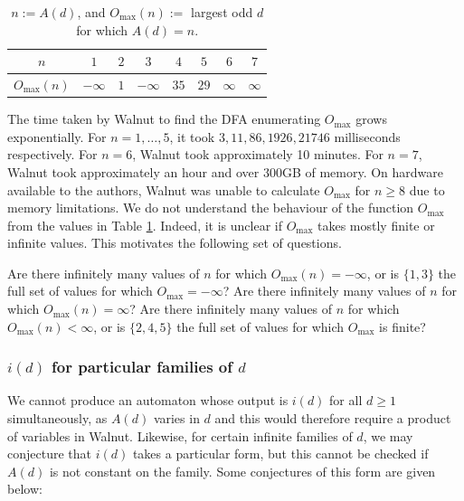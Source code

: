\documentclass[10pt,a4paper,reqno]{amsart}
\newcommand{\walnut}{{\ttfamily Walnut}}
\begin{document}
\begin{table}[ht]
    \centering
    \begin{tabular}{|c|c|c|c|c|c|c|c|}
    \hline
       $n$  & $1$ & $2$& $3$& $4$& $5$& $6$& $7$ \\
       \hline
       $O_{\max}(n)$ & $-\infty$& $1$& $-\infty$& $35$ & $29$& $\infty$& $\infty$\\
        \hline
    \end{tabular}
    \caption{$n:=A(d)$, and $O_{\max}(n):=$ largest odd $d$ for which $A(d)=n$.}
    \label{tab:tmlodforad}
\end{table}
    The time taken by \walnut{} to find the DFA enumerating $O_{\max}$ grows exponentially. For $n=1,\dots ,5$, it took $3,11,86,1926,21746$ milliseconds respectively. For $n=6$, \walnut{} took approximately 10 minutes. For $n=7$, \walnut{} took approximately an hour and over $300$GB of memory. On hardware available to the authors, \walnut{} was unable to calculate $O_{\max}$ for $n \geq 8$ due to memory limitations. We do not understand the behaviour of the function $O_{\max}$ from the values in Table \ref{tab:tmlodforad}. Indeed, it is unclear if $O_{\max}$ takes mostly finite or infinite values.
This motivates the following set of questions.
\begin{que}
   Are there infinitely many values of $n$ for which $O_{\max}(n) = -\infty$, or is $\{1,3\}$ the full set of values for which $O_{\max} = -\infty$?
   Are there infinitely many values of $n$ for which $O_{\max}(n)=\infty$?
   Are there infinitely many values of $n$ for which $O_{\max}(n)<\infty$, or is $\{2,4,5\}$ the full set of values for which $O_{\max}$ is finite?
\end{que}
\subsubsection{\texorpdfstring{$i(d)$}{i(d)} for particular families of \texorpdfstring{$d$}{d}}
We cannot produce an automaton whose output is $i(d)$ for all $d \geq 1$ simultaneously, as $A(d)$ varies in $d$ and this would therefore require a product of variables in \walnut{}. Likewise, for certain infinite families of $d$, we may conjecture that $i(d)$ takes a particular form, but this cannot be checked if $A(d)$ is not constant on the family. Some conjectures of this form are given below:
\end{document}

